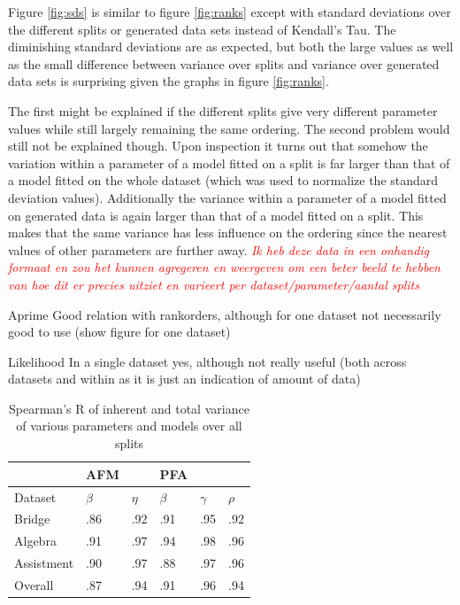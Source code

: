 \documentclass{scrartcl}
\newcommand\todo[1]{\textit{\textcolor{red}{#1}}}
\begin{document}
Figure \ref{fig:sds} is similar to figure \ref{fig:ranks} except with standard deviations over the different splits or generated data sets instead of Kendall's Tau. The diminishing standard deviations are as expected, but both the large values as well as the small difference between variance over splits and variance over generated data sets is surprising given the graphs in figure \ref{fig:ranks}. 

The first might be explained if the different splits give very different parameter values while still largely remaining the same ordering. The second problem would still not be explained though. Upon inspection it turns out that somehow the variation within a parameter of a model fitted on a split is far larger than that of a model fitted on the whole dataset (which was used to normalize the standard deviation values). Additionally the variance within a parameter of a model fitted on generated data is again larger than that of a model fitted on a split. This makes that the same variance has less influence on the ordering since the nearest values of other parameters are further away.
\todo{Ik heb deze data in een onhandig formaat en zou het kunnen agregeren en weergeven om een beter beeld te hebben van hoe dit er precies uitziet en varieert per dataset/parameter/aantal splits}


Aprime
Good relation with rankorders, although for one dataset not necessarily good to use (show figure for one dataset)

Likelihood
In a single dataset yes, although not really useful (both across datasets and within as it is just an indication of amount of data)



\begin{center}
\begin{table}


\label{tab:intorank}
\begin{tabular}{| l || l | l ||l|l |l|}

    \hline
     & AFM  & & PFA & &   \\ \hline
    Dataset & $\beta$ & $\eta$ & $\beta$ & $\gamma$ & $\rho$  \\ \hline
    Bridge &.86 &.92 & .91& .95 &  .92 \\ \hline
    Algebra & .91 & .97 & .94 &.98&  .96 \\ \hline
    Assistment & .90 & .97 & .88& .97& .96 \\ \hline \hline
    Overall & .87  & .94 & .91 & .96 & .94 \\
    \hline
\end{tabular}
\caption{Spearman's R of inherent and total variance of various parameters and models over all splits}
\end{table}

\end{center}
\end{document}
